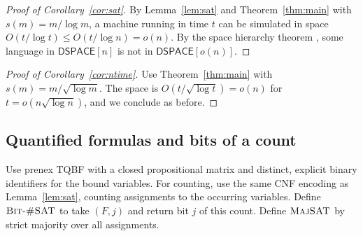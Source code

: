 \documentclass[11pt]{article}
\theoremstyle{remark}
\newcommand{\DSPACE}{\mathsf{DSPACE}}
\begin{document}
\begin{proof}[Proof of Corollary~\ref{cor:sat}]
By Lemma~\ref{lem:sat} and Theorem~\ref{thm:main} with $s(m)=m/\log m$,
a machine running in time $t$ can be simulated in space
$O(t/\log t)\le O(t/\log n)=o(n)$. By the space hierarchy theorem
\cite{SHL}, some language in $\DSPACE[n]$ is not in $\DSPACE[o(n)]$.
\end{proof}

\begin{proof}[Proof of Corollary~\ref{cor:ntime}]
Use Theorem~\ref{thm:main} with $s(m)=m/\sqrt{\log m}$. The space is
$O(t/\sqrt{\log t})=o(n)$ for $t=o(n\sqrt{\log n})$, and we conclude as
before.
\end{proof}

\subsection{Quantified formulas and bits of a count}\label{sec:formula-oracles}
Use prenex TQBF with a closed propositional matrix and distinct,
explicit binary identifiers for the bound variables. For counting,
use the same CNF encoding as Lemma~\ref{lem:sat}, counting assignments
to the occurring variables. Define $\textsc{Bit-\#SAT}$ to take
$(F,j)$ and return bit $j$ of this count. Define $\textsc{MajSAT}$ by
strict majority over all assignments.
\end{document}
